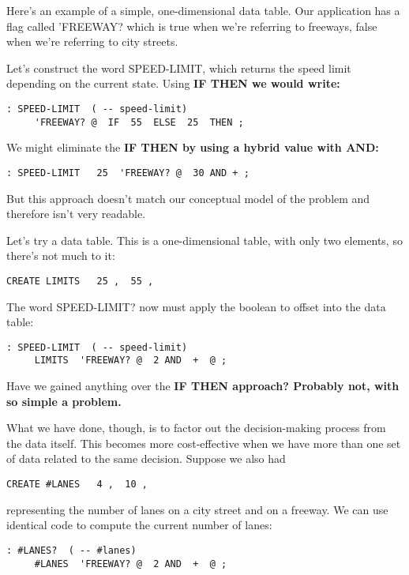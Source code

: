 Here's an example of a simple, one-dimensional data table. Our application
has a flag called 'FREEWAY? which is true when we're referring to
freeways, false when we're referring to city streets.

Let's construct the word SPEED-LIMIT, which returns the speed
limit depending on the current state. Using \bf{IF THEN} we would write:

\begin{verbatim}
: SPEED-LIMIT  ( -- speed-limit)
     'FREEWAY? @  IF  55  ELSE  25  THEN ;
\end{verbatim}

We might eliminate the \bf{IF THEN} by using a hybrid value with \bf{AND}:

\begin{verbatim}
: SPEED-LIMIT   25  'FREEWAY? @  30 AND + ;
\end{verbatim}

But this approach doesn't match our conceptual model of the problem
and therefore isn't very readable.

Let's try a data table. This is a one-dimensional table, with only two
elements, so there's not much to it:

\begin{verbatim}
CREATE LIMITS   25 ,  55 ,
\end{verbatim}

The word SPEED-LIMIT? now must apply the boolean to offset into
the data table:

\begin{verbatim}
: SPEED-LIMIT  ( -- speed-limit)
     LIMITS  'FREEWAY? @  2 AND  +  @ ;
\end{verbatim}

Have we gained anything over the \bf{IF THEN} approach? Probably not,
with so simple a problem.

What we have done, though, is to factor out the decision-making
process from the data itself. This becomes more cost-effective when we
have more than one set of data related to the same decision. Suppose we
also had

\begin{verbatim}
CREATE #LANES   4 ,  10 ,
\end{verbatim}

representing the number of lanes on a city street and on a freeway. We
can use identical code to compute the current number of lanes:

\begin{verbatim}
: #LANES?  ( -- #lanes)
     #LANES  'FREEWAY? @  2 AND  +  @ ;
\end{verbatim}

